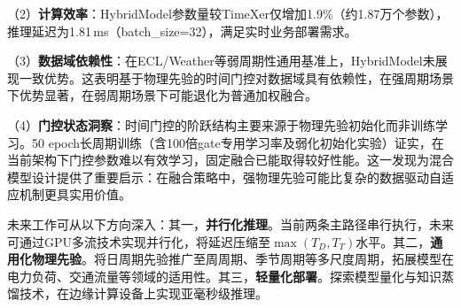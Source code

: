 \documentclass[12pt,a4paper]{article}
\begin{document}
（2）\textbf{计算效率}：HybridModel参数量较TimeXer仅增加1.9\%（约1.87万个参数），推理延迟为1.81\,ms（batch\_size=32），满足实时业务部署需求。

（3）\textbf{数据域依赖性}：在ECL/Weather等弱周期性通用基准上，HybridModel未展现一致优势。这表明基于物理先验的时间门控对数据域具有依赖性，在强周期场景下优势显著，在弱周期场景下可能退化为普通加权融合。

（4）\textbf{门控状态洞察}：时间门控的阶跃结构主要来源于物理先验初始化而非训练学习。50 epoch长周期训练（含100倍gate专用学习率及弱化初始化实验）证实，在当前架构下门控参数难以有效学习，固定融合已能取得较好性能。这一发现为混合模型设计提供了重要启示：在融合策略中，强物理先验可能比复杂的数据驱动自适应机制更具实用价值。

未来工作可从以下方向深入：其一，\textbf{并行化推理}。当前两条主路径串行执行，未来可通过GPU多流技术实现并行化，将延迟压缩至$\max(T_D, T_T)$水平。其二，\textbf{通用化物理先验}。将日周期先验推广至周周期、季节周期等多尺度周期，拓展模型在电力负荷、交通流量等领域的适用性。其三，\textbf{轻量化部署}。探索模型量化与知识蒸馏技术，在边缘计算设备上实现亚毫秒级推理。
\end{document}
